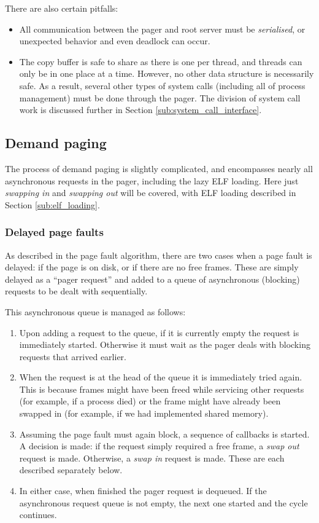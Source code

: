 \documentclass[12pt,english]{article}
\begin{document}
There are also certain pitfalls:
\begin{itemize}
\item All communication between the pager and root server must be \emph{serialised}, or unexpected behavior and even deadlock can occur.
\item The copy buffer is safe to share as there is one per thread, and threads can only be in one place at a time.  However, no other data structure is necessarily safe.  As a result, several other types of system calls (including all of process management) must be done through the pager.  The division of system call work is discussed further in Section \ref{sub:system_call_interface}.
\end{itemize}

\subsection{Demand paging} \label{sub:demand_paging}

The process of demand paging is slightly complicated, and encompasses nearly all asynchronous requests in the pager, including the lazy ELF loading.  Here just \emph{swapping in} and \emph{swapping out} will be covered, with ELF loading described in Section \ref{sub:elf_loading}.

\subsubsection{Delayed page faults}

As described in the page fault algorithm, there are two cases when a page fault is delayed: if the page is on disk, or if there are no free frames.  These are simply delayed as a ``pager request'' and added to a queue of asynchronous (blocking) requests to be dealt with sequentially.

This asynchronous queue is managed as follows:
\begin{enumerate}
\item Upon adding a request to the queue, if it is currently empty the request is immediately started.  Otherwise it must wait as the pager deals with blocking requests that arrived earlier.
\item When the request is at the head of the queue it is immediately tried again.  This is because frames might have been freed while servicing other requests (for example, if a process died) or the frame might have already been swapped in (for example, if we had implemented shared memory).
\item Assuming the page fault must again block, a sequence of callbacks is started.  A decision is made: if the request simply required a free frame, a \emph{swap out} request is made.  Otherwise, a \emph{swap in} request is made.  These are each described separately below.
\item In either case, when finished the pager request is dequeued.  If the asynchronous request queue is not empty, the next one started and the cycle continues.
\end{enumerate}
\end{document}
